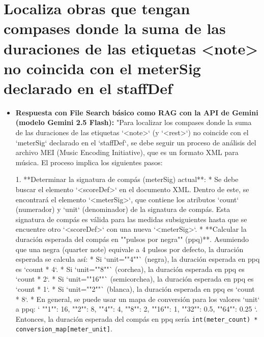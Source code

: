 \begin{itemize}
\end{itemize}

\section{Localiza obras que tengan compases donde la suma de las duraciones de las etiquetas <note> no coincida con el meterSig declarado en el staffDef}
\begin{itemize}
    \item \textbf{Respuesta con File Search básico como RAG con la API de Gemini (modelo Gemini 2.5 Flash):} "Para localizar los compases donde la suma de las duraciones de las etiquetas `<note>` (y `<rest>`) no coincide con el `meterSig` declarado en el `staffDef`, se debe seguir un proceso de análisis del archivo MEI (Music Encoding Initiative), que es un formato XML para música. El proceso implica los siguientes pasos:

1.  **Determinar la signatura de compás (meterSig) actual**:
    *   Se debe buscar el elemento `<scoreDef>` en el documento XML. Dentro de este, se encontrará el elemento `<meterSig>`, que contiene los atributos `count` (numerador) y `unit` (denominador) de la signatura de compás. Esta signatura de compás es válida para las medidas subsiguientes hasta que se encuentre otro `<scoreDef>` con una nueva `<meterSig>`.
    *   **Calcular la duración esperada del compás en ""pulsos por negra"" (ppq)**. Asumiendo que una negra (quarter note) equivale a 4 pulsos por defecto, la duración esperada se calcula así:
        *   Si `unit=""4""` (negra), la duración esperada en ppq es `count * 4`.
        *   Si `unit=""8""` (corchea), la duración esperada en ppq es `count * 2`.
        *   Si `unit=""16""` (semicorchea), la duración esperada en ppq es `count * 1`.
        *   Si `unit=""2""` (blanca), la duración esperada en ppq es `count * 8`.
        *   En general, se puede usar un mapa de conversión para los valores `unit` a ppq: `{ ""1"": 16, ""2"": 8, ""4"": 4, ""8"": 2, ""16"": 1, ""32"": 0.5, ""64"": 0.25 }`. Entonces, la duración esperada del compás en ppq sería \texttt{int(meter\_count) * conversion\_map[meter\_unit]}.


\end{itemize}
